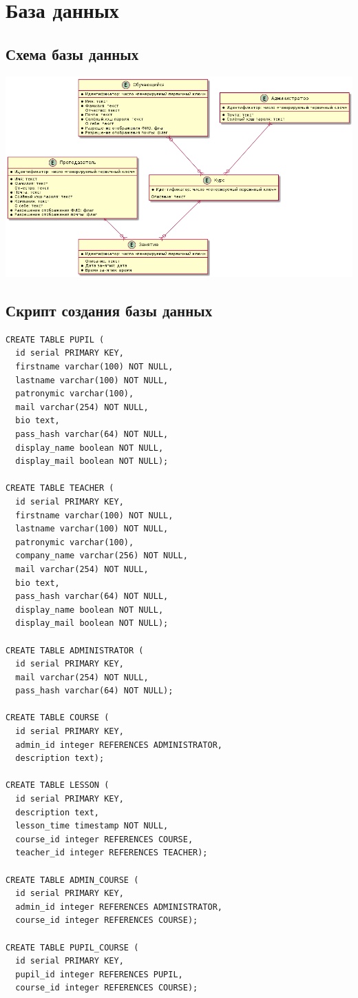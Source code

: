 \documentclass[11pt]{article}
\begin{document}
\section{База данных}
\label{sec:org530ff66}
\subsection{Схема базы данных}
\label{sec:org31d714b}
\begin{center}
\includegraphics[width=.9\linewidth]{db.png}
\end{center}

\subsection{Скрипт создания базы данных}
\label{sec:orgb007b7b}
\begin{verbatim}
CREATE TABLE PUPIL (
  id serial PRIMARY KEY,
  firstname varchar(100) NOT NULL,
  lastname varchar(100) NOT NULL,
  patronymic varchar(100),
  mail varchar(254) NOT NULL,
  bio text,
  pass_hash varchar(64) NOT NULL,
  display_name boolean NOT NULL,
  display_mail boolean NOT NULL);

CREATE TABLE TEACHER (
  id serial PRIMARY KEY,
  firstname varchar(100) NOT NULL,
  lastname varchar(100) NOT NULL,
  patronymic varchar(100),
  company_name varchar(256) NOT NULL,
  mail varchar(254) NOT NULL,
  bio text,
  pass_hash varchar(64) NOT NULL,
  display_name boolean NOT NULL,
  display_mail boolean NOT NULL);

CREATE TABLE ADMINISTRATOR (
  id serial PRIMARY KEY,
  mail varchar(254) NOT NULL,
  pass_hash varchar(64) NOT NULL);

CREATE TABLE COURSE (
  id serial PRIMARY KEY,
  admin_id integer REFERENCES ADMINISTRATOR,
  description text);

CREATE TABLE LESSON (
  id serial PRIMARY KEY,
  description text,
  lesson_time timestamp NOT NULL,
  course_id integer REFERENCES COURSE,
  teacher_id integer REFERENCES TEACHER);

CREATE TABLE ADMIN_COURSE (
  id serial PRIMARY KEY,
  admin_id integer REFERENCES ADMINISTRATOR,
  course_id integer REFERENCES COURSE);

CREATE TABLE PUPIL_COURSE (
  id serial PRIMARY KEY,
  pupil_id integer REFERENCES PUPIL,
  course_id integer REFERENCES COURSE);
\end{verbatim}
\end{document}
